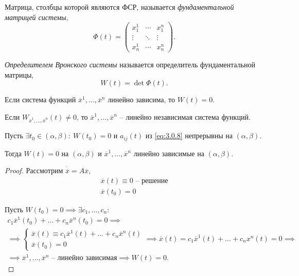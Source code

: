 \begin{definition}
    Матрица, столбцы которой являются ФСР, называется \emph{фундаментальной матрицей системы},
    \[
        \Phi(t) = \left(\begin{matrix}
                x_1^1  & \cdots & x_1^n  \\
                \vdots & \ddots & \vdots \\
                x_n^1  & \cdots & x_n^n
            \end{matrix}\right).
    \]
\end{definition}

\begin{definition}
    \emph{Определителем Вронского системы} называется определитель фундаментальной матрицы,
    \[
        W(t) = \det \Phi(t).
    \]
\end{definition}

\begin{theorem}
    Если система функций $ \overline{x}^1,\ldots,\overline{x}^n $ линейно зависима, то $ W(t) = 0 $.
\end{theorem}

\begin{corollary}
    Если $ W_{\overline{x}^1,\ldots,\overline{x}^n}(t)\ne 0 $, то $ \overline{x}^1,\ldots,\overline{x}^n $ -- линейно независимая система функций.
\end{corollary}

\begin{theorem}
    Пусть $ \exists t_0 \in (\alpha,\beta): \ W(t_0) = 0 $ и $ a_{ij}(t) $ из \ref{eq:3.0.8} непрерывны на $ (\alpha,\beta) $.

    Тогда $ W(t) = 0 $ на $ (\alpha,\beta) $ и $ \overline{x}^1,\ldots,\overline{x}^n $ линейно зависимые на $ (\alpha,\beta) $.
\end{theorem}

\begin{proof}
    Рассмотрим $ \dot{\overline{x}} = A \overline{x} $,
    \[
        \boxed{\begin{array}{l}
                \overline{x}(t)\equiv 0 \text{ -- решение} \\
                \overline{x}(t_0) = 0
            \end{array}}
    \]

    Пусть $ W(t_0) = 0 \implies \exists c_1,\ldots,c_n :$
    \begin{multline*}
        c_1 \overline{x}^1(t_0) + \ldots + c_n \overline{x}^n(t_0) = 0 \implies \\
        \implies \boxed{\left\{\begin{array}{l}
                \overline{x}(t) \equiv c_1 \overline{x}^1(t) + \ldots + c_n \overline{x}^n(t) \\
                \overline{x}(t_0) = 0
            \end{array}\right.} \implies \overline{x}(t) = c_1 \overline{x}^1(t) + \ldots + c_n x^n(t) = 0 \implies \\
        \implies \overline{x}^1,\ldots,\overline{x}^n \text{ -- линейно зависимая} \implies W(t) = 0.
    \end{multline*}
\end{proof}

